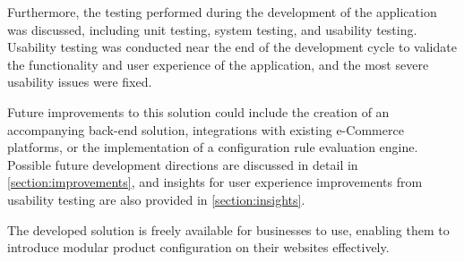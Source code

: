 Furthermore, the testing performed during the development of the application was discussed, including unit testing, system testing, and usability testing. Usability testing was conducted near the end of the development cycle to validate the functionality and user experience of the application, and the most severe usability issues were fixed.

Future improvements to this solution could include the creation of an accompanying back-end solution, integrations with existing e-Commerce platforms, or the implementation of a configuration rule evaluation engine. Possible future development directions are discussed in detail in \autoref{section:improvements}, and insights for user experience improvements from usability testing are also provided in \autoref{section:insights}.

The developed solution is freely available for businesses to use, enabling them to introduce modular product configuration on their websites effectively.